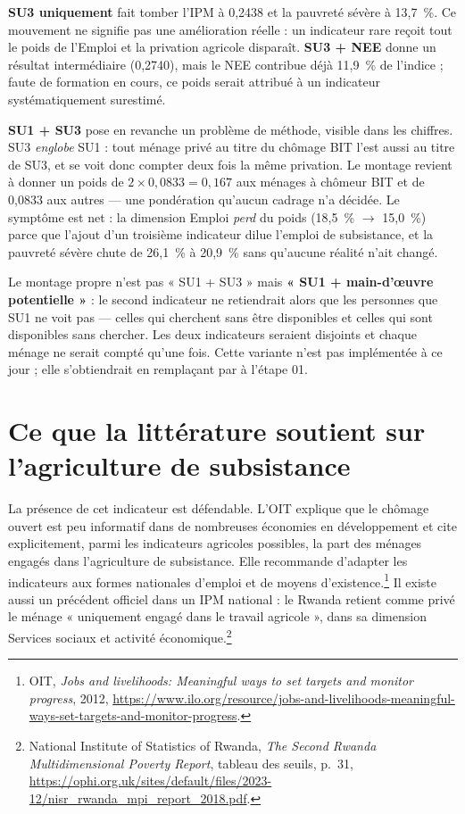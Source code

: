 \documentclass[11pt,a4paper]{article}
\begin{document}
\textbf{SU3 uniquement} fait tomber l'IPM à 0,2438 et la pauvreté sévère à 13,7~\%. Ce mouvement
ne signifie pas une amélioration réelle : un indicateur rare reçoit tout le poids de l'Emploi et
la privation agricole disparaît. \textbf{SU3 + NEE} donne un résultat intermédiaire (0,2740), mais
le NEE contribue déjà 11,9~\% de l'indice ; faute de formation en cours, ce poids serait attribué
à un indicateur systématiquement surestimé.

\textbf{SU1 + SU3} pose en revanche un problème de méthode, visible dans les chiffres. SU3
\emph{englobe} SU1 : tout ménage privé au titre du chômage BIT l'est aussi au titre de SU3, et se
voit donc compter deux fois la même privation. Le montage revient à donner un poids de
$2 \times 0{,}0833 = 0{,}167$ aux ménages à chômeur BIT et de 0,0833 aux autres --- une
pondération qu'aucun cadrage n'a décidée. Le symptôme est net : la dimension Emploi
\emph{perd} du poids (18,5~\% $\rightarrow$ 15,0~\%) parce que l'ajout d'un troisième indicateur
dilue l'emploi de subsistance, et la pauvreté sévère chute de 26,1~\% à 20,9~\% sans qu'aucune
réalité n'ait changé.

\begin{attention}
Le montage propre n'est pas « SU1 + SU3 » mais \textbf{« SU1 + main-d'\oe uvre potentielle »} :
le second indicateur ne retiendrait alors que les personnes que SU1 ne voit pas --- celles qui
cherchent sans être disponibles et celles qui sont disponibles sans chercher. Les deux
indicateurs seraient disjoints et chaque ménage ne serait compté qu'une fois. Cette variante n'est
pas implémentée à ce jour ; elle s'obtiendrait en remplaçant  par
 à l'étape 01.
\end{attention}

\section{Ce que la littérature soutient sur l'agriculture de subsistance}

La présence de cet indicateur est défendable. L'OIT explique que le chômage ouvert est peu
informatif dans de nombreuses économies en développement et cite explicitement, parmi les
indicateurs agricoles possibles, la part des ménages engagés dans l'agriculture de subsistance.
Elle recommande d'adapter les indicateurs aux formes nationales d'emploi et de moyens
d'existence.\footnote{OIT, \emph{Jobs and livelihoods: Meaningful ways to set targets and monitor
progress}, 2012, \url{https://www.ilo.org/resource/jobs-and-livelihoods-meaningful-ways-set-targets-and-monitor-progress}.}
Il existe aussi un précédent officiel dans un IPM national : le Rwanda retient comme privé le
ménage « uniquement engagé dans le travail agricole », dans sa dimension Services sociaux et
activité économique.\footnote{National Institute of Statistics of Rwanda, \emph{The Second Rwanda
Multidimensional Poverty Report}, tableau des seuils, p.~31,
\url{https://ophi.org.uk/sites/default/files/2023-12/nisr_rwanda_mpi_report_2018.pdf}.}
\end{document}
